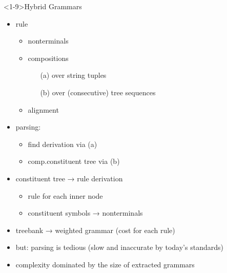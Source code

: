 \documentclass[aspectratio=169, 10pt]{beamer}
\begin{document}
    \begin{frame}<1-9>{Hybrid Grammars \cite{VogDre,Geb,Geb}}
        \begin{minipage}{.58\linewidth}
            \resizebox{\linewidth}{!}{
                }
        \end{minipage}
        \begin{minipage}{.4\linewidth}
            \begin{itemize}
                \item rule
                    \begin{itemize}
                        \item nonterminals
                        \item compositions
                            \begin{itemize}
                                \item[(a)] over string tuples
                                \item[(b)] over (consecutive) tree sequences
                            \end{itemize}
                        \item alignment
                    \end{itemize}
                \item parsing:
                \begin{itemize}
                    \item find derivation via (a)
                    \item comp.\@ constituent tree via (b)
                \end{itemize}

                \item constituent tree → rule derivation
                \begin{itemize}
                    \item rule for each inner node
                    \item constituent symbols → nonterminals
                \end{itemize}
                \item treebank → weighted grammar (cost for each rule) \cite{}
                \item but: parsing is tedious (slow and inaccurate by today's standards) \cite{}
                \item complexity dominated by the size of extracted grammars \cite{}
            \end{itemize}
        \end{minipage}


\end{frame}
\end{document}

